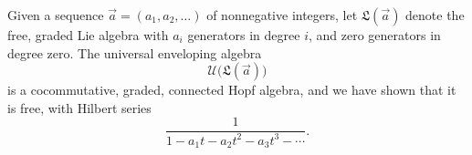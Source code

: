\documentclass[11pt]{amsart}
\newtheorem{thm}{Theorem}
\theoremstyle{definition}
\numberwithin{equation}{section}
\newcommand{\mike}[1]{\todo[size=\tiny,color=green!30]{#1 \\ \hfill --- Mike}}
\begin{document}
Given a sequence $\vec{a} = (a_{1}, a_{2}, \ldots)$ of nonnegative integers, let $\mathfrak{L}(\vec{a})$ denote the free, graded Lie algebra with $a_{i}$ generators in degree $i$, and zero generators in degree zero.  The universal enveloping algebra
\[
\mathcal{U}\big(\mathfrak{L}(\vec{a})\big)
\]
is a cocommutative, graded, connected Hopf algebra, and we have shown that it is free, with Hilbert series
\[
\frac{1}{1 - a_{1}t - a_{2}t^{2} - a_{3}t^{3} - \cdots}.
\]

%
%
\end{document}
